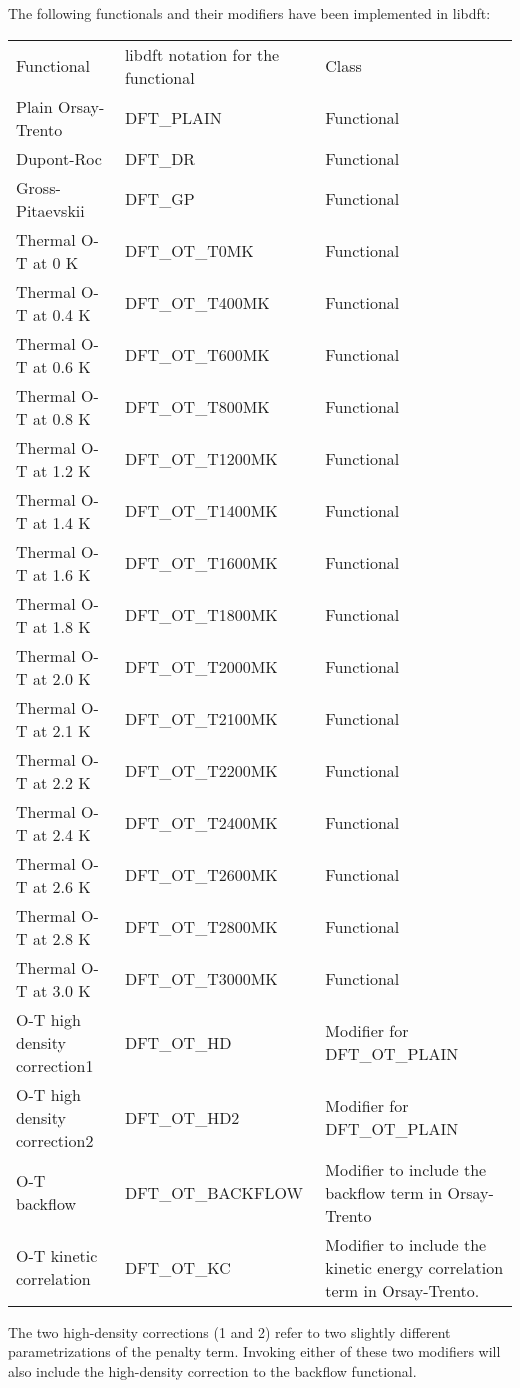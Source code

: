 \documentclass[12pt,letterpaper]{report}
\begin{document}
The following functionals and their modifiers have been implemented in libdft:

\begin{longtable}{p{} p{} p{}}
Functional & libdft notation for the functional & Class\\
\cline{1-3}
Plain Orsay-Trento & DFT\_PLAIN & Functional\\
Dupont-Roc & DFT\_DR & Functional\\
Gross-Pitaevskii & DFT\_GP & Functional\\
Thermal O-T at 0 K & DFT\_OT\_T0MK & Functional\\
Thermal O-T at 0.4 K & DFT\_OT\_T400MK & Functional\\
Thermal O-T at 0.6 K & DFT\_OT\_T600MK & Functional\\
Thermal O-T at 0.8 K & DFT\_OT\_T800MK & Functional\\
Thermal O-T at 1.2 K & DFT\_OT\_T1200MK & Functional\\
Thermal O-T at 1.4 K & DFT\_OT\_T1400MK & Functional\\
Thermal O-T at 1.6 K & DFT\_OT\_T1600MK & Functional\\
Thermal O-T at 1.8 K & DFT\_OT\_T1800MK & Functional\\
Thermal O-T at 2.0 K & DFT\_OT\_T2000MK & Functional\\
Thermal O-T at 2.1 K & DFT\_OT\_T2100MK & Functional\\
Thermal O-T at 2.2 K & DFT\_OT\_T2200MK & Functional\\
Thermal O-T at 2.4 K & DFT\_OT\_T2400MK & Functional\\
Thermal O-T at 2.6 K & DFT\_OT\_T2600MK & Functional\\
Thermal O-T at 2.8 K & DFT\_OT\_T2800MK & Functional\\
Thermal O-T at 3.0 K & DFT\_OT\_T3000MK & Functional\\
O-T high density correction1 & DFT\_OT\_HD & Modifier for DFT\_OT\_PLAIN\\
O-T high density correction2 & DFT\_OT\_HD2 & Modifier for DFT\_OT\_PLAIN\\
O-T backflow & DFT\_OT\_BACKFLOW & Modifier to include the backflow term in Orsay-Trento\\
O-T kinetic correlation & DFT\_OT\_KC & Modifier to include the kinetic energy correlation term in Orsay-Trento.\\ 
\end{longtable}
\noindent
The two high-density corrections (1 and 2) refer to two slightly different parametrizations of the penalty term. Invoking either of these two modifiers will also include the high-density correction to the backflow functional.
\end{document}
